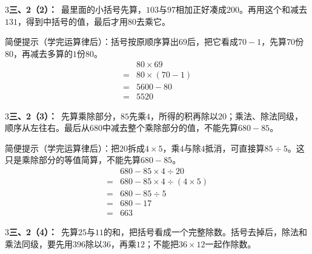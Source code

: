 \documentclass[multi=snippet,border={5bp 20bp 5bp 5bp}]{standalone}
\newenvironment{snippet}[3]{\begin{minipage}{#1bp}\color{answerred}\fontsize{#2}{#3}\selectfont\raggedright}{\end{minipage}}
\begin{document}
\begin{snippet}{505}{11.5}{14}\begin{multicols}{3}\raggedcolumns \textbf{三、2（2）：}\ 最里面的小括号先算，\(103\)\allowbreak 与\(97\)\allowbreak 相加正好凑成\(200\)\allowbreak 。再用这个和减去\(131\)\allowbreak ，得到中括号的值，最后才用\(80\)\allowbreak 去乘它。\par 简便提示（学完运算律后）：括号按原顺序算出\(69\)\allowbreak 后，把它看成\(70-1\)\allowbreak ，先算\(70\)\allowbreak 份\(80\)\allowbreak ，再减去多算的\(1\)\allowbreak 份\(80\)\allowbreak 。\[\begin{aligned}&80\times69\\={}&80\times(70-1)\\={}&5600-80\\={}&5520\end{aligned}\]\end{multicols}\end{snippet}
\begin{snippet}{505}{11.5}{14}\begin{multicols}{3}\raggedcolumns \textbf{三、2（3）：}\ 先算乘除部分，\(85\)\allowbreak 先乘\(4\)\allowbreak ，所得的积再除以\(20\)\allowbreak ；乘法、除法同级，顺序从左往右。最后从\(680\)\allowbreak 中减去整个乘除部分的值，不能先算\(680-85\)\allowbreak 。\par 简便提示（学完运算律后）：把\(20\)\allowbreak 拆成\(4\times5\)\allowbreak ，乘\(4\)\allowbreak 与除\(4\)\allowbreak 抵消，可直接算\(85\div5\)\allowbreak 。这只是乘除部分的等值简算，不能先算\(680-85\)\allowbreak 。\[\begin{aligned}&680-85\times4\div20\\={}&680-85\times4\div(4\times5)\\={}&680-85\div5\\={}&680-17\\={}&663\end{aligned}\]\end{multicols}\end{snippet}
\begin{snippet}{505}{11.5}{14}\begin{multicols}{3}\raggedcolumns \textbf{三、2（4）：}\ 先算\(25\)\allowbreak 与\(11\)\allowbreak 的和，把括号看成一个完整除数。括号去掉后，除法和乘法同级，要先用\(396\)\allowbreak 除以\(36\)\allowbreak ，再乘\(12\)\allowbreak ；不能把\(36\times12\)\allowbreak 一起作除数。\end{multicols}\end{snippet}
\end{document}
